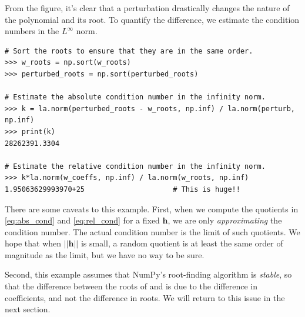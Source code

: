 From the figure, it's clear that a perturbation drastically changes the nature of the polynomial and its root.
To quantify the difference, we estimate the condition numbers in the $L^\infty$ norm.

\begin{lstlisting}
# Sort the roots to ensure that they are in the same order.
>>> w_roots = np.sort(w_roots)
>>> perturbed_roots = np.sort(perturbed_roots)

# Estimate the absolute condition number in the infinity norm.
>>> k = la.norm(perturbed_roots - w_roots, np.inf) / la.norm(perturb, np.inf)
>>> print(k)
28262391.3304

# Estimate the relative condition number in the infinity norm.
>>> k*la.norm(w_coeffs, np.inf) / la.norm(w_roots, np.inf)
1.95063629993970+25                     # This is huge!!
\end{lstlisting}

There are some caveats to this example.
First, when we compute the quotients in \eqref{eq:abs_cond} and \eqref{eq:rel_cond} for a fixed $\mathbf{h}$, we are only \emph{approximating} the condition number.
The actual condition number is the limit of such quotients.
We hope that when $||\mathbf{h}||$ is small, a random quotient is at least the same order of magnitude as the limit, but we have no way to be sure.

Second, this example assumes that NumPy's root-finding algorithm is \emph{stable}, so that the difference between the roots of  and  is due to the difference in coefficients, and not the difference in roots.
We will return to this issue in the next section.

